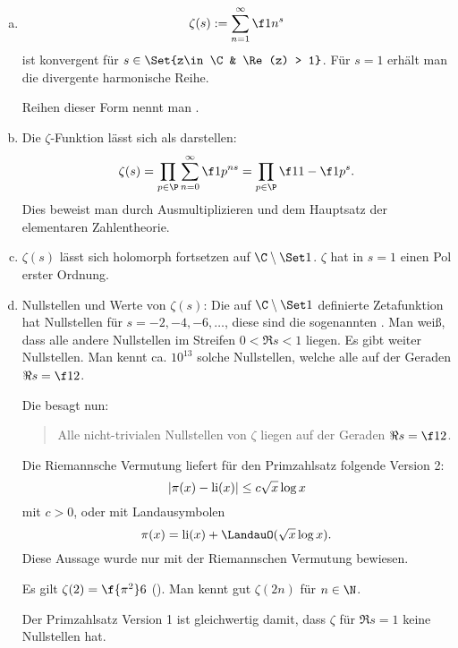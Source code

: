 \begin{nt} \label{7.11}
	\begin{enumerate}[a)]
		\item
			\[
				\zeta(s) := \sum_{n=1}^\infty \f 1{n^s}
			\]
			ist konvergent für $s \in \Set{z\in \C & \Re(z) > 1}$.
			Für $s = 1$ erhält man die divergente harmonische Reihe.

			Reihen dieser Form nennt man .
		\item
			Die $\zeta$-Funktion lässt sich als  darstellen:
			\[
				\zeta(s)
				= \prod_{p\in\P} \sum_{n=0}^\infty \f 1{p^{ns}}
				= \prod_{p\in\P} \f 1{1 - \f 1{p^s}}.
			\]
			Dies beweist man durch Ausmultiplizieren und dem Hauptsatz der elementaren Zahlentheorie.
		\item
			$\zeta(s)$ lässt sich holomorph fortsetzen auf $\C \setminus \Set 1$.
			$\zeta$ hat in $s = 1$ einen Pol erster Ordnung.
		\item
			Nullstellen und Werte von $\zeta(s)$:
			Die auf $\C \setminus \Set 1$ definierte Zetafunktion hat Nullstellen für $s = -2, -4, -6, \dotsc$,
			diese sind die sogenannten .
			Man weiß, dass alle andere Nullstellen im Streifen $0 < \Re s < 1$ liegen.
			Es gibt weiter Nullstellen.
			Man kennt ca. $10^{13}$ solche Nullstellen, welche alle auf der Geraden $\Re s = \f 12$.

			Die  besagt nun:
			\begin{quote}
				Alle nicht-trivialen Nullstellen von $\zeta$ liegen auf der Geraden $\Re s = \f 12$.
			\end{quote}

			Die Riemannsche Vermutung liefert für den Primzahlsatz folgende Version 2:
			\[
				|\pi(x) - \operatorname{li}(x)|
				\le c \sqrt x \log x
			\]
			mit $c > 0$, oder mit Landausymbolen
			\[
				\pi(x) = \li(x) + \LandauO(\sqrt x \log x).
			\]
			Diese Aussage wurde nur mit der Riemannschen Vermutung bewiesen.

			Es gilt $\zeta(2) = \f{\pi^2}6$ ().
			Man kennt gut $\zeta(2n)$ für $n \in \N$.

			Der Primzahlsatz Version 1 ist gleichwertig damit, dass $\zeta$ für $\Re s = 1$ keine Nullstellen hat.
	\end{enumerate}
\end{nt}


